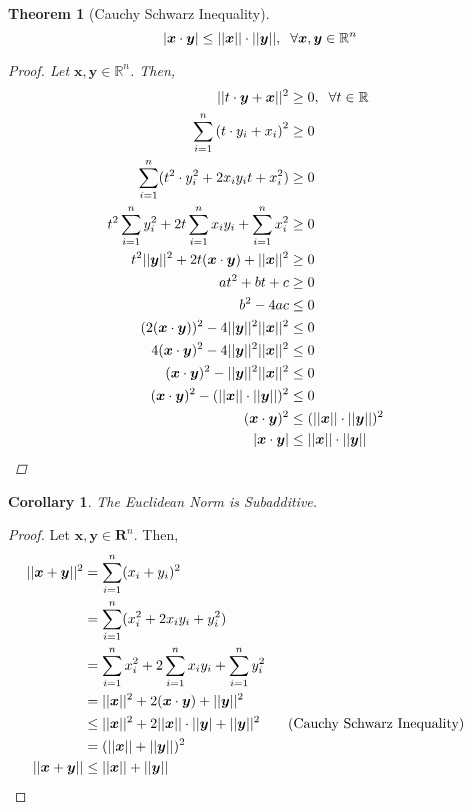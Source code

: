 \documentclass{article}
\newtheorem{theorem}{Theorem}[section]
\newtheorem{corollary}{Corollary}[theorem]
\begin{document}
			\begin{theorem}[Cauchy Schwarz Inequality]
			\label{cauchy-schwarz}
				$$|\bm{x}\cdot\bm{y}| \leq ||\bm{x}||\cdot||\bm{y}||, \hspace{2 mm} \forall \bm{x}, \bm{y} \in \mathbb{R}^n$$
			\begin{proof}
				Let $\bm{x}, \bm{y} \in \mathbb{R}^n$. Then,
				\begin{align*}
					||t \cdot \bm{y} + \bm{x}||^2 &\geq 0, \hspace{2 mm} \forall t \in \mathbb{R}\\
					\sum\limits_{i=1}^n {(t \cdot y_i + x_i)}^2 &\geq 0\\
					\sum\limits_{i=1}^n (t^2 \cdot y_i^2 + 2x_i y_i t+x_i^2) &\geq 0\\
					t^2 \sum\limits_{i=1}^n y_i^2 + 2t \sum\limits_{i=1}^n x_i y_i + \sum\limits_{i=1}^n x_i^2 &\geq 0\\
					t^2 ||\bm{y}||^2 + 2t (\bm{x}\cdot\bm{y}) + ||\bm{x}||^2 &\geq 0\\
					a t^2+bt+c &\geq 0\\
					b^2-4ac &\le 0\\
					(2(\bm{x}\cdot\bm{y}))^2 - 4||\bm{y}||^2 ||\bm{x}||^2 &\leq 0\\
					4(\bm{x}\cdot\bm{y})^2 - 4||\bm{y}||^2 ||\bm{x}||^2 &\leq 0\\
					(\bm{x}\cdot\bm{y})^2 - ||\bm{y}||^2 ||\bm{x}||^2 &\leq 0\\
					(\bm{x}\cdot\bm{y})^2 - (||\bm{x}|| \cdot ||\bm{y}||)^2 &\leq 0\\
					(\bm{x}\cdot\bm{y})^2 &\leq (||\bm{x}|| \cdot ||\bm{y}||)^2\\
					|\bm{x}\cdot\bm{y}| &\leq ||\bm{x}|| \cdot ||\bm{y}|| &&\qedhere
				\end{align*}
			\end{proof}
			\end{theorem}

			\begin{corollary}
				The Euclidean Norm is Subadditive.
			\end{corollary}
			\begin{proof}
				Let $\bm{x}, \bm{y} \in \mathbf{R}^n$. Then,
				\begin{align*}
					||\bm{x} + \bm{y}||^2 &= \sum\limits_{i=1}^n (x_i + y_i)^2\\
										  &= \sum\limits_{i=1}^n (x_i^2 + 2x_i y_i + y_i^2)\\
										  &= \sum\limits_{i=1}^n x_i^2 + 2 \sum\limits_{i=1}^n x_i y_i + \sum\limits_{i=1}^n y_i^2\\
										  &= ||\bm{x}||^2 + 2 (\bm{x} \cdot \bm{y}) + ||\bm{y}||^2\\
										  &\leq ||\bm{x}||^2 + 2 ||\bm{x}|| \cdot ||\bm{y}| + ||\bm{y}||^2 \tag{Cauchy Schwarz Inequality}\\
										  &= (||\bm{x}|| + ||\bm{y}||)^2\\
					  ||\bm{x} + \bm{y}|| &\leq ||\bm{x}|| + ||\bm{y}|| &&\qedhere
				\end{align*}
				
			\end{proof}
\end{document}

